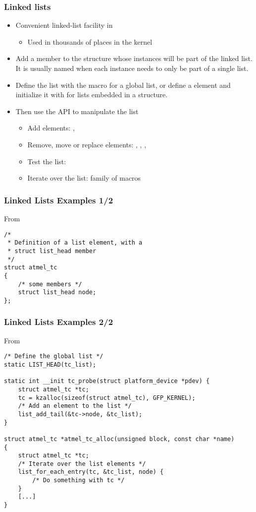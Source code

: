 \begin{frame}
  \frametitle{Linked lists}
  \begin{itemize}
  \item Convenient linked-list facility in 
    \begin{itemize}
    \item Used in thousands of places in the kernel
    \end{itemize}
  \item Add a  member to the structure whose
    instances will be part of the linked list. It is usually named
     when each instance needs to only be part of a single
    list.
  \item Define the list with the  macro for a global
    list, or define a  element and initialize
    it with  for lists embedded in a structure.
  \item Then use the  API to manipulate the list
    \begin{itemize}
    \item Add elements: , 
    \item Remove, move or replace elements: ,
      , ,
    \item Test the list: 
    \item Iterate over the list:  family of macros
    \end{itemize}
  \end{itemize}
\end{frame}

\begin{frame}[fragile]
  \frametitle{Linked Lists Examples 1/2}
  From 
\begin{verbatim}
/*
 * Definition of a list element, with a
 * struct list_head member
 */
struct atmel_tc
{
    /* some members */
    struct list_head node;
};
\end{verbatim}
\end{frame}

\begin{frame}[fragile]
  \frametitle{Linked Lists Examples 2/2}
  From 
\begin{verbatim}
/* Define the global list */
static LIST_HEAD(tc_list);

static int __init tc_probe(struct platform_device *pdev) {
    struct atmel_tc *tc;
    tc = kzalloc(sizeof(struct atmel_tc), GFP_KERNEL);
    /* Add an element to the list */
    list_add_tail(&tc->node, &tc_list);
}

struct atmel_tc *atmel_tc_alloc(unsigned block, const char *name)
{
    struct atmel_tc *tc;
    /* Iterate over the list elements */
    list_for_each_entry(tc, &tc_list, node) {
        /* Do something with tc */
    }
    [...]
}
\end{verbatim}
\end{frame}
